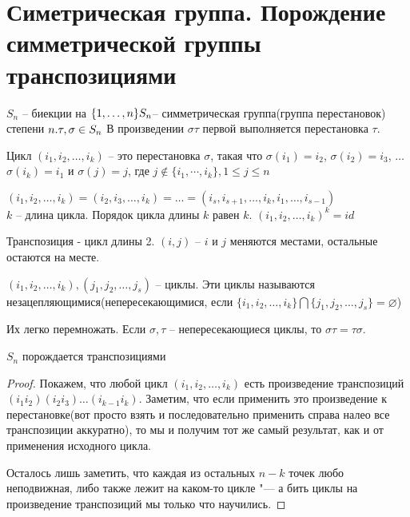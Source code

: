 \section{Симетрическая группа. Порождение симметрической группы транспозициями}


$S_n$ -- биекции на $\{1, \dotsc  , n\}\\ S_n $-- симметрическая группа(группа перестановок) степени $n.\\ \tau, \sigma \in S_n\\$ В произведении $\sigma\tau$ первой выполняется перестановка $\tau$.\\

\begin{Def}
	Цикл $(i_1, i_2, \dotsc, i_k)$ -- это перестановка $\sigma$, такая что 
	$\sigma(i_1) = i_2$, 
	$\sigma(i_2) = i_3$, 
	$\dotsc$\\
	$\sigma(i_k) = i_1$ 
	и $\sigma(j) = j$, где $j \notin \{i_1, \dotsb, i_k\}, 1 \le j \le n$
\end{Def}

$(i_1, i_2, \dotsc, i_k) = (i_2, i_3, \dotsc, i_k) = \dotsc = (i_s, i_{s+1}, \dotsc, i_k, i_1, \dotsc, i_{s - 1})$\\
$k$ -- длина цикла. Порядок цикла длины $k$ равен $k$.
$(i_1, i_2, \dotsc, i_k)^k = id$\\

\begin{Def}
	Транспозиция - цикл длины 2.
	$(i, j)$ -- $i$ и $j$ меняются местами, остальные остаются на месте.
\end{Def}

\begin{Def}
	$(i_1, i_2, \dotsc, i_k), (j_1, j_2, \dotsc, j_s)$ -- циклы. Эти циклы называются незацепляющимися(непересекающимися, если $\{i_1, i_2, \dotsc, i_k\} \bigcap \{j_1, j_2, \dotsc, j_s\} = \varnothing$)
\end{Def}

Их легко перемножать. Если $\sigma, \tau$ -- непересекающиеся циклы, то $\sigma\tau = \tau\sigma$.

\begin{theorem}{$S_n$ порождается транспозициями}
\end{theorem}
\begin{proof}
Покажем, что любой цикл $(i_1, i_2, \dotsc, i_k)$ есть произведение транспозиций $(i_1 i_2)(i_2 i_3)\dotsc(i_{k - 1}i_k)$. Заметим, что если применить это произведение к перестановке(вот просто взять и последовательно применить справа налео все транспозиции аккуратно), то мы и получим тот же самый результат, как и от применения исходного цикла.

Осталось лишь заметить, что каждая из остальных $n - k$ точек любо неподвижная, либо также лежит на каком-то цикле "--- а бить циклы на произведение транспозиций мы только что научились.
\end{proof}
